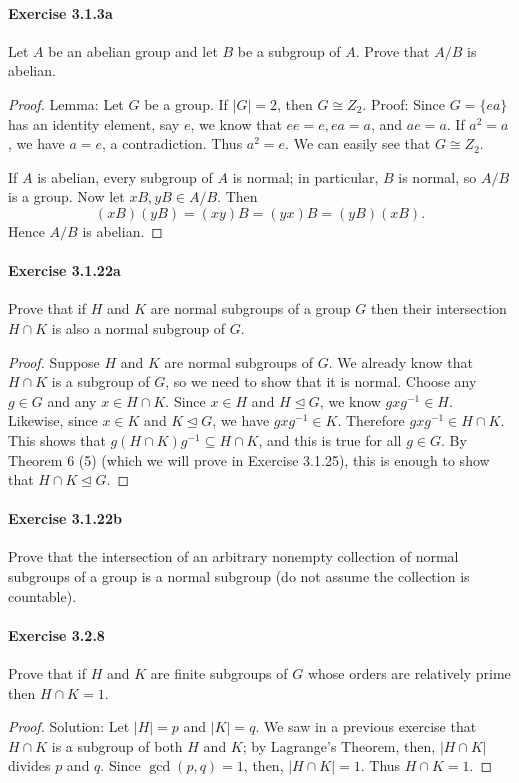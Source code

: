 \documentclass{article}
\theoremstyle{definition}
\begin{document}
\paragraph{Exercise 3.1.3a} Let $A$ be an abelian group and let $B$ be a subgroup of $A$. Prove that $A / B$ is abelian.
\begin{proof}
    Lemma: Let $G$ be a group. If $|G|=2$, then $G \cong Z_2$.
Proof: Since $G=\{e a\}$ has an identity element, say $e$, we know that $e e=e, e a=a$, and $a e=a$. If $a^2=a$, we have $a=e$, a contradiction. Thus $a^2=e$. We can easily see that $G \cong Z_2$.

If $A$ is abelian, every subgroup of $A$ is normal; in particular, $B$ is normal, so $A / B$ is a group. Now let $x B, y B \in A / B$. Then
$$
(x B)(y B)=(x y) B=(y x) B=(y B)(x B) .
$$
Hence $A / B$ is abelian.
\end{proof}



\paragraph{Exercise 3.1.22a} Prove that if $H$ and $K$ are normal subgroups of a group $G$ then their intersection $H \cap K$ is also a normal subgroup of $G$.
\begin{proof}
    Suppose $H$ and $K$ are normal subgroups of $G$. We already know that $H \cap K$ is a subgroup of $G$, so we need to show that it is normal. Choose any $g \in G$ and any $x \in H \cap K$. Since $x \in H$ and $H \unlhd G$, we know $g x g^{-1} \in H$. Likewise, since $x \in K$ and $K \unlhd G$, we have $g x g^{-1} \in K$. Therefore $g x g^{-1} \in H \cap K$. This shows that $g(H \cap K) g^{-1} \subseteq H \cap K$, and this is true for all $g \in G$. By Theorem 6 (5) (which we will prove in Exercise 3.1.25), this is enough to show that $H \cap K \unlhd G$.
\end{proof}



\paragraph{Exercise 3.1.22b} Prove that the intersection of an arbitrary nonempty collection of normal subgroups of a group is a normal subgroup (do not assume the collection is countable).


\paragraph{Exercise 3.2.8} Prove that if $H$ and $K$ are finite subgroups of $G$ whose orders are relatively prime then $H \cap K=1$.
\begin{proof}
    Solution: Let $|H|=p$ and $|K|=q$. We saw in a previous exercise that $H \cap K$ is a subgroup of both $H$ and $K$; by Lagrange's Theorem, then, $|H \cap K|$ divides $p$ and $q$. Since $\operatorname{gcd}(p, q)=1$, then, $|H \cap K|=1$. Thus $H \cap K=1$.
\end{proof}
\end{document}
